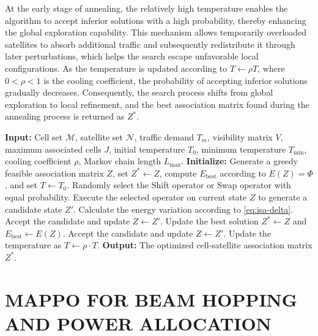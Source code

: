 \documentclass[journal]{IEEEtran}
\newcommand{\revminorbegin}[1]{\color{black}\ignorespaces}
\newcommand{\revend}[1]{\color{black}\ignorespaces}
\begin{document}
At the early stage of annealing, the relatively high temperature enables the algorithm to accept inferior solutions with a high probability, thereby enhancing the global exploration capability. This mechanism allows temporarily overloaded satellites to absorb additional traffic and subsequently redistribute it through later perturbations, which helps the search escape unfavorable local configurations. As the temperature is updated according to $T\leftarrow\rho T$, where $0<\rho<1$ is the cooling coefficient, the probability of accepting inferior solutions gradually decreases. Consequently, the search process shifts from global exploration to local refinement, and the best association matrix found during the annealing process is returned as $Z^*$.

\revminorbegin{}\begin{algorithm}[t]
\revminorbegin{}
\caption{\revminorbegin{}Improved Simulated Annealing for P1}
\label{alg:isa}
\begin{algorithmic}[1]
\STATE \textbf{Input:} Cell set $\mathcal{M}$, satellite set $\mathcal{N}$, traffic demand $T_m$, visibility matrix $V$, maximum associated cells $J$, initial temperature $T_0$, minimum temperature $T_{\min}$, cooling coefficient $\rho$, Markov chain length $L_{\max}$.
\STATE \textbf{Initialize:} Generate a greedy feasible association matrix $Z$, set $Z^* \leftarrow Z$, compute $E_{\text{best}}$ according to $E(Z)=\Phi$, and set $T \leftarrow T_0$.
\STATE Randomly select the Shift operator or Swap operator with equal probability.
\STATE Execute the selected operator on current state $Z$ to generate a candidate state $Z'$.
\STATE Calculate the energy variation according to \eqref{eq:isa-delta}.
\STATE Accept the candidate and update $Z \leftarrow Z'$.
\STATE Update the best solution $Z^* \leftarrow Z$ and $E_{\text{best}} \leftarrow E(Z)$.
\ENDIF
\ELSE
{}
\STATE Accept the candidate and update $Z \leftarrow Z'$.
\ENDIF
\ENDIF
\ENDFOR
\STATE Update the temperature as $T \leftarrow \rho \cdot T$.
\ENDWHILE
\STATE \textbf{Output:} The optimized cell-satellite association matrix $Z^*$.
\end{algorithmic}
\revend{}
\end{algorithm}
\revend{}

\section{MAPPO FOR BEAM HOPPING AND POWER ALLOCATION}
\label{sec:mappo}
\end{document}
